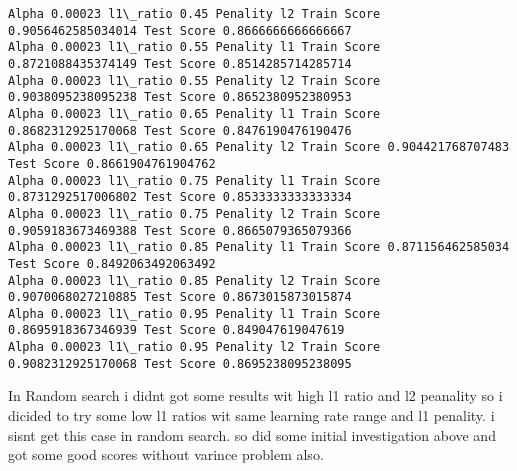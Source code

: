\documentclass[11pt]{article}
\begin{document}
\begin{Verbatim}[commandchars=\\\{\}]
Alpha 0.00023 l1\_ratio 0.45 Penality l2 Train Score 0.9056462585034014 Test Score 0.8666666666666667
Alpha 0.00023 l1\_ratio 0.55 Penality l1 Train Score 0.8721088435374149 Test Score 0.8514285714285714
Alpha 0.00023 l1\_ratio 0.55 Penality l2 Train Score 0.9038095238095238 Test Score 0.8652380952380953
Alpha 0.00023 l1\_ratio 0.65 Penality l1 Train Score 0.8682312925170068 Test Score 0.8476190476190476
Alpha 0.00023 l1\_ratio 0.65 Penality l2 Train Score 0.904421768707483 Test Score 0.8661904761904762
Alpha 0.00023 l1\_ratio 0.75 Penality l1 Train Score 0.8731292517006802 Test Score 0.8533333333333334
Alpha 0.00023 l1\_ratio 0.75 Penality l2 Train Score 0.9059183673469388 Test Score 0.8665079365079366
Alpha 0.00023 l1\_ratio 0.85 Penality l1 Train Score 0.871156462585034 Test Score 0.8492063492063492
Alpha 0.00023 l1\_ratio 0.85 Penality l2 Train Score 0.9070068027210885 Test Score 0.8673015873015874
Alpha 0.00023 l1\_ratio 0.95 Penality l1 Train Score 0.8695918367346939 Test Score 0.849047619047619
Alpha 0.00023 l1\_ratio 0.95 Penality l2 Train Score 0.9082312925170068 Test Score 0.8695238095238095

    \end{Verbatim}

    In Random search i didnt got some results wit high l1 ratio and l2
peanality so i dicided to try some low l1 ratios wit same learning rate
range and l1 penality. i sisnt get this case in random search. so did
some initial investigation above and got some good scores without
varince problem also.
\end{document}
